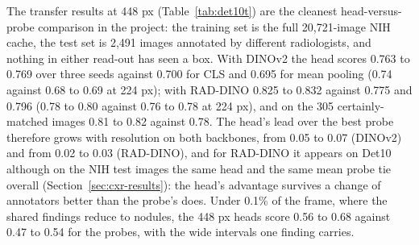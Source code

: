\documentclass[10pt,letterpaper,twocolumn]{article}
\begin{document}
The transfer results at 448 px (Table~\ref{tab:det10t}) are the cleanest head-versus-probe
comparison in the project: the training set is the full 20,721-image NIH cache, the test set
is 2,491 images annotated by different radiologists, and nothing in either read-out has seen
a box. With DINOv2 the head scores 0.763 to 0.769 over three seeds against 0.700 for CLS and
0.695 for mean pooling (0.74 against 0.68 to 0.69 at 224 px); with RAD-DINO 0.825 to 0.832
against 0.775 and 0.796 (0.78 to 0.80 against 0.76 to 0.78 at 224 px), and on the 305
certainly-matched images 0.81 to 0.82 against 0.78. The head's lead over the best probe
therefore grows with resolution on both backbones, from 0.05 to 0.07 (DINOv2) and from 0.02
to 0.03 (RAD-DINO), and for RAD-DINO it appears on Det10 although on the NIH test images the
same head and the same mean probe tie overall (Section~\ref{sec:cxr-results}): the head's
advantage survives a change of annotators better than the probe's does. Under 0.1\% of the
frame, where the shared findings reduce to nodules, the 448 px heads score 0.56 to 0.68
against 0.47 to 0.54 for the probes, with the wide intervals one finding carries.
\end{document}
